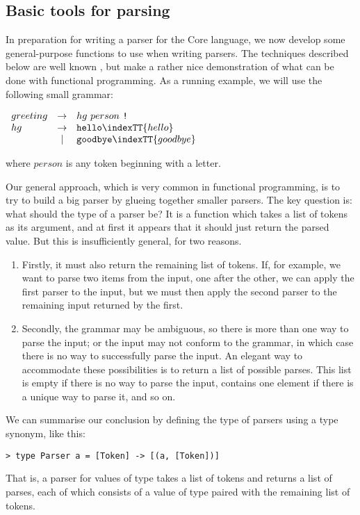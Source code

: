 \subsection{Basic tools for parsing}

In preparation for writing a parser for the Core language,
we now develop some general-purpose functions to use
when writing parsers.
The techniques described
below are well known \cite{FairbairnParser,WadlerParser},
but make a rather nice demonstration of what
can be done with functional programming.
As a running example, we will use the following small grammar:
\begin{center}
$\begin{array}{lcl}
greeting & \rightarrow & hg ~person~\mbox{\tt !} \\
hg       & \rightarrow & \mbox{\tt hello}\indexTT{hello} \\
        & | & \mbox{\tt goodbye}\indexTT{goodbye}
\end{array}$
\end{center}
where $person$ is any token beginning with a letter.

Our general approach, which is very common in functional programming,
is to try to build a big parser by glueing together smaller parsers.
The key question is:
what should the type of a parser be?  It is a function which
takes a list of tokens as its argument, and at first it appears that
it should just return the parsed value.  But this is insufficiently general,
for two reasons.
\begin{enumerate}
\item
Firstly, it must also return the remaining list of tokens.
If, for example, we want to parse two items from the input, one after
the other, we can apply the first parser to the input, but we must then
apply the second parser to the remaining input returned by the first.
\item
Secondly, the grammar may be ambiguous, so there is more than one way
to parse the input; or the input may not conform to the grammar,
in which case there
is no way to successfully parse the input.
An elegant way to accommodate these possibilities is to return a list
of possible parses.  This list is empty if there is no way to parse the input,
contains one element if there is a unique way to parse it, and so on.
\end{enumerate}
We can summarise our conclusion by defining
the type of parsers using a type synonym,
like this:
\begin{verbatim}
> type Parser a = [Token] -> [(a, [Token])]
\end{verbatim}
%
That is, a parser for values of type \mbox{\tt *} takes a list of tokens and
returns a list of parses, each of which consists of a value of type \mbox{\tt *}
paired with the remaining list of tokens.

